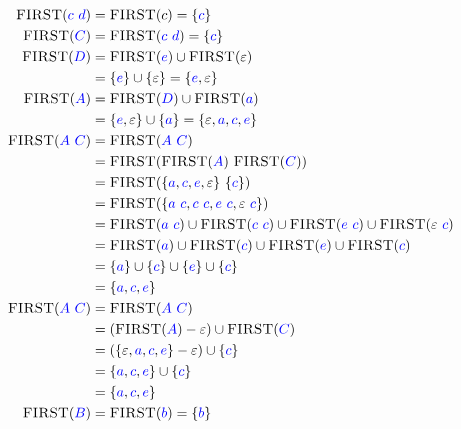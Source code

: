 \documentclass{article}
\newcommand{\FIRST}{\textsc{FIRST}}
\newcommand{\Symbol}[1]{\textcolor{blue}{#1}}
\newcommand{\Null}{\varepsilon}
\newcommand{\Seq}{\ }
\begin{document}
\begin{align*}
  \FIRST(\Symbol{c} \Seq \Symbol{d}) &= \FIRST(c) = \{\Symbol{c}\} \\
  \FIRST(\Symbol{C}) &= \FIRST(\Symbol{c} \Seq \Symbol{d}) = \{\Symbol{c}\} \\
  \FIRST(\Symbol{D}) &= \FIRST(\Symbol{e}) \cup \FIRST(\Null) \\
            &= \{\Symbol{e}\} \cup \{\Null\} = \{\Symbol{e}, \Null\} \\
  \FIRST(\Symbol{A}) &= \FIRST(\Symbol{D}) \cup \FIRST(\Symbol{a}) \\
            &= \{\Symbol{e}, \Null\} \cup \{\Symbol{a}\} = \{\Null, \Symbol{a}, \Symbol{c}, \Symbol{e}\} \\
  \FIRST(\Symbol{A} \Seq \Symbol{C}) &= \FIRST(\Symbol{A} \Seq \Symbol{C}) \\
            &= \FIRST(\FIRST(\Symbol{A}) \Seq \FIRST(\Symbol{C})) \\
            &= \FIRST(\{\Symbol{a}, \Symbol{c}, \Symbol{e}, \Null\} \Seq \{\Symbol{c}\})\\
            &= \FIRST(\{\Symbol{a} \Seq \Symbol{c}, \Symbol{c} \Seq \Symbol{c}, \Symbol{e} \Seq \Symbol{c}, \Null \Seq \Symbol{c}\})\\
            &= \FIRST(\Symbol{a} \Seq \Symbol{c}) \cup \FIRST(\Symbol{c} \Seq \Symbol{c}) \cup \FIRST(\Symbol{e} \Seq \Symbol{c}) \cup \FIRST(\Null \Seq \Symbol{c})\\
            &= \FIRST(\Symbol{a}) \cup \FIRST(\Symbol{c}) \cup \FIRST(\Symbol{e}) \cup \FIRST(\Symbol{c}) \\
            &= \{\Symbol{a}\} \cup \{\Symbol{c}\} \cup \{\Symbol{e}\} \cup \{\Symbol{c}\}\\
            &= \{\Symbol{a}, \Symbol{c}, \Symbol{e}\}\\
  \FIRST(\Symbol{A} \Seq \Symbol{C}) &= \FIRST(\Symbol{A} \Seq \Symbol{C}) \\
            &= (\FIRST(\Symbol{A}) - \Null) \cup \FIRST(\Symbol{C}) \\
            &= (\{\Null, \Symbol{a}, \Symbol{c}, \Symbol{e}\} - \Null) \cup \{\Symbol{c}\} \\
            &= \{\Symbol{a}, \Symbol{c}, \Symbol{e}\} \cup \{\Symbol{c}\}\\
            &= \{\Symbol{a}, \Symbol{c}, \Symbol{e}\}\\
  \FIRST(\Symbol{B}) &= \FIRST(\Symbol{b}) = \{\Symbol{b}\}
\end{align*}
\end{document}
